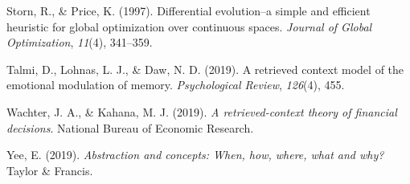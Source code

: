 \documentclass[
  letterpaper,
]{article}
\newlength{\cslhangindent}
\newlength{\cslentryspacingunit} %
\newenvironment{CSLReferences}[2] %
 {%
  \setlength{\parindent}{0pt}
  \ifodd #1
  \let\oldpar\par
  \def\par{\hangindent=\cslhangindent\oldpar}
  \fi
  \setlength{\parskip}{#2\cslentryspacingunit}
 }%
 {}
\begin{document}
\begin{CSLReferences}{1}{0}
\leavevmode{}%
Storn, R., \& Price, K. (1997). Differential evolution--a simple and
efficient heuristic for global optimization over continuous spaces.
\emph{Journal of Global Optimization}, \emph{11}(4), 341--359.

\leavevmode{}%
Talmi, D., Lohnas, L. J., \& Daw, N. D. (2019). A retrieved context
model of the emotional modulation of memory. \emph{Psychological
Review}, \emph{126}(4), 455.

\leavevmode{}%
Wachter, J. A., \& Kahana, M. J. (2019). \emph{A retrieved-context
theory of financial decisions}. National Bureau of Economic Research.

\leavevmode{}%
Yee, E. (2019). \emph{Abstraction and concepts: When, how, where, what
and why?} Taylor \& Francis.

\end{CSLReferences}
\end{document}
